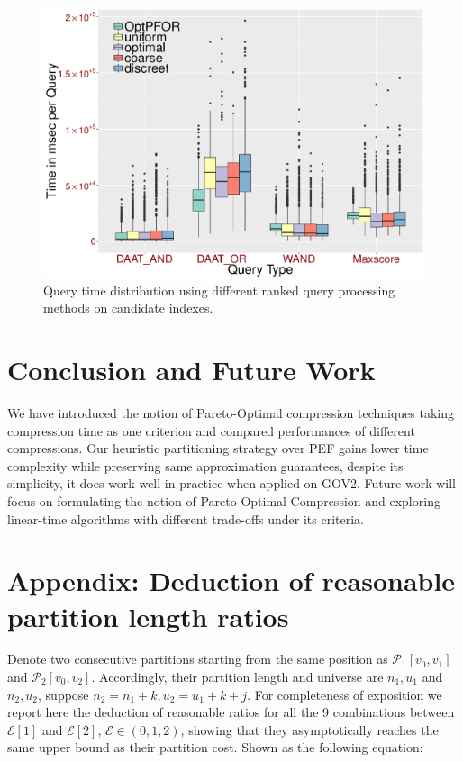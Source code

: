 \documentclass[runningheads,a4paper]{llncs}
\begin{document}
\begin{figure}
	\centering
	\includegraphics[width=0.7\linewidth]{queries}
	\caption{Query time distribution using different ranked query processing methods on candidate indexes.}
	\label{fig:queries}
\end{figure}

\section{Conclusion and Future Work}\label{sec:conclusion}

We have introduced the notion of Pareto-Optimal compression techniques taking compression time as one criterion and compared performances of different compressions. Our heuristic partitioning strategy over PEF gains lower time complexity while preserving same approximation guarantees,
despite its simplicity, it does work well in practice when applied on GOV2.
Future work will focus on formulating the notion of Pareto-Optimal Compression and exploring linear-time algorithms with different trade-offs under its criteria.




\section*{Appendix: Deduction of reasonable partition length ratios}\label{apd}
Denote two consecutive partitions starting from the same position as $ \mathcal{P}_{1}[ v_0, v_1 ] $ and $ \mathcal{P}_{2}[v_0, v_2] $. Accordingly, their partition length and universe are $ n_1, u_1 $ and $ n_2, u_2 $, suppose $n_2 = n_1 + k, u_2 = u_1 + k + j $.
For completeness of exposition we report here the deduction of reasonable ratios for all the 9 combinations between $ \mathcal{E}[1] $ and $ \mathcal{E}[2] $, $ \mathcal{E} \in (0,1,2) $, showing that they asymptotically reaches the same upper bound as their partition cost. Shown as the following equation:
\end{document}
